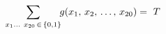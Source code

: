 \documentclass[preview]{standalone}
\begin{document}
\begin{align*}
\special{dvisvgm:raw <g id='unique000'>}\sum_{x_1\ldots\ x_{20}\,\in\,\{0,1\}}\!\! g(x_1,\,x_2,\,\ldots,\,x_{20})=\  \special{dvisvgm:raw </g>}\special{dvisvgm:raw <g id='unique001'>}T\special{dvisvgm:raw </g>}
\end{align*}
\end{document}
